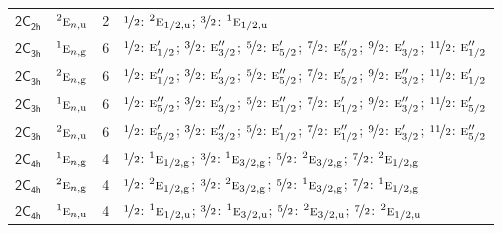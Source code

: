 \documentclass[10pt,a4paper]{article}
\numberwithin{equation}{section}
\newcommand{\grp}[1]{\mathsf{#1}}
\newcommand{\irr}[1]{\text{\normalfont\scshape #1}}
\newcommand{\conjpair}[1]{{}^{#1}}
\newcommand{\ptag}[1]{\mathrm{#1}}
\newlength{\fillwidth}\newlength{\cellwidth}\newlength{\colwidth}
\begin{document}
{\begin{longtable}{@{}llr>{\RaggedRight\arraybackslash}p{\fillwidth}@{}}
\href{2C2h.pdf}{$\grp{2C_{2h}}$} & $\conjpair{2}\irr{e}_{n,\ptag{u}}$ & 2 & $\nicefrac{1}{2}$: $\conjpair{2}\irr{e}_{1/2,\ptag{u}}$; $\nicefrac{3}{2}$: $\conjpair{1}\irr{e}_{1/2,\ptag{u}}$\\
\href{2C3h.pdf}{$\grp{2C_{3h}}$} & $\conjpair{1}\irr{e}_{n,\ptag{g}}$ & 6 & $\nicefrac{1}{2}$: $\irr{e}_{1/2}'$; $\nicefrac{3}{2}$: $\irr{e}_{3/2}''$; $\nicefrac{5}{2}$: $\irr{e}_{5/2}'$; $\nicefrac{7}{2}$: $\irr{e}_{5/2}''$; $\nicefrac{9}{2}$: $\irr{e}_{3/2}'$; $\nicefrac{11}{2}$: $\irr{e}_{1/2}''$\\
\href{2C3h.pdf}{$\grp{2C_{3h}}$} & $\conjpair{2}\irr{e}_{n,\ptag{g}}$ & 6 & $\nicefrac{1}{2}$: $\irr{e}_{1/2}''$; $\nicefrac{3}{2}$: $\irr{e}_{3/2}'$; $\nicefrac{5}{2}$: $\irr{e}_{5/2}''$; $\nicefrac{7}{2}$: $\irr{e}_{5/2}'$; $\nicefrac{9}{2}$: $\irr{e}_{3/2}''$; $\nicefrac{11}{2}$: $\irr{e}_{1/2}'$\\
\href{2C3h.pdf}{$\grp{2C_{3h}}$} & $\conjpair{1}\irr{e}_{n,\ptag{u}}$ & 6 & $\nicefrac{1}{2}$: $\irr{e}_{5/2}''$; $\nicefrac{3}{2}$: $\irr{e}_{3/2}'$; $\nicefrac{5}{2}$: $\irr{e}_{1/2}''$; $\nicefrac{7}{2}$: $\irr{e}_{1/2}'$; $\nicefrac{9}{2}$: $\irr{e}_{3/2}''$; $\nicefrac{11}{2}$: $\irr{e}_{5/2}'$\\
\href{2C3h.pdf}{$\grp{2C_{3h}}$} & $\conjpair{2}\irr{e}_{n,\ptag{u}}$ & 6 & $\nicefrac{1}{2}$: $\irr{e}_{5/2}'$; $\nicefrac{3}{2}$: $\irr{e}_{3/2}''$; $\nicefrac{5}{2}$: $\irr{e}_{1/2}'$; $\nicefrac{7}{2}$: $\irr{e}_{1/2}''$; $\nicefrac{9}{2}$: $\irr{e}_{3/2}'$; $\nicefrac{11}{2}$: $\irr{e}_{5/2}''$\\
\href{2C4h.pdf}{$\grp{2C_{4h}}$} & $\conjpair{1}\irr{e}_{n,\ptag{g}}$ & 4 & $\nicefrac{1}{2}$: $\conjpair{1}\irr{e}_{1/2,\ptag{g}}$; $\nicefrac{3}{2}$: $\conjpair{1}\irr{e}_{3/2,\ptag{g}}$; $\nicefrac{5}{2}$: $\conjpair{2}\irr{e}_{3/2,\ptag{g}}$; $\nicefrac{7}{2}$: $\conjpair{2}\irr{e}_{1/2,\ptag{g}}$\\
\href{2C4h.pdf}{$\grp{2C_{4h}}$} & $\conjpair{2}\irr{e}_{n,\ptag{g}}$ & 4 & $\nicefrac{1}{2}$: $\conjpair{2}\irr{e}_{1/2,\ptag{g}}$; $\nicefrac{3}{2}$: $\conjpair{2}\irr{e}_{3/2,\ptag{g}}$; $\nicefrac{5}{2}$: $\conjpair{1}\irr{e}_{3/2,\ptag{g}}$; $\nicefrac{7}{2}$: $\conjpair{1}\irr{e}_{1/2,\ptag{g}}$\\
\href{2C4h.pdf}{$\grp{2C_{4h}}$} & $\conjpair{1}\irr{e}_{n,\ptag{u}}$ & 4 & $\nicefrac{1}{2}$: $\conjpair{1}\irr{e}_{1/2,\ptag{u}}$; $\nicefrac{3}{2}$: $\conjpair{1}\irr{e}_{3/2,\ptag{u}}$; $\nicefrac{5}{2}$: $\conjpair{2}\irr{e}_{3/2,\ptag{u}}$; $\nicefrac{7}{2}$: $\conjpair{2}\irr{e}_{1/2,\ptag{u}}$\\

\end{longtable}}
\end{document}
